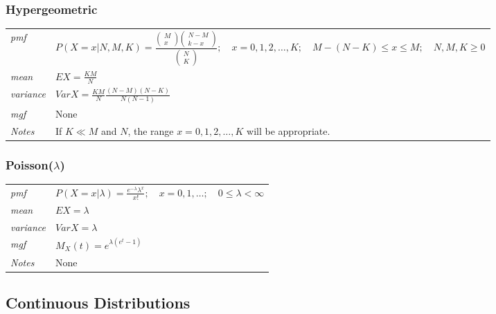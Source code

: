 \documentclass[12pt]{article}
\begin{document}
\subsubsection*{Hypergeometric \cite[p. 622]{StatisticalInference}}
\begin{tabularx}{\textwidth}{ l X }
\emph{pmf} & $P(X=x|N, M, K)=\frac{
\begin{pmatrix}
M \\
x
\end{pmatrix}
\begin{pmatrix}
N - M \\
k - x
\end{pmatrix}
}{
\begin{pmatrix}
N \\
K
\end{pmatrix}}; \quad x=0, 1, 2, \dots, K; \quad M - (N - K) \leq x \leq M; \quad N, M, K \geq 0$ \\
\emph{mean} & $EX=\frac{KM}{N}$ \\
\emph{variance} & $Var X = \frac{KM}{N} \frac{(N-M)(N-K)}{N(N-1)}$ \\
\emph{mgf} & None \\
\emph{Notes} & If $K \ll M$ and $N$, the range $x=0, 1, 2, \dots, K$ will be appropriate.\\
\end{tabularx}

\subsubsection*{Poisson($\lambda$) \cite[p. 622]{StatisticalInference}}
\begin{tabularx}{\textwidth}{ l X }
\emph{pmf} & $P(X=x|\lambda)=\frac{e^{-\lambda}\lambda^x}{x!}; \quad x=0, 1, \dots; \quad 0 \leq \lambda <\infty$ \\
\emph{mean} & $EX=\lambda$ \\
\emph{variance} & $Var X =\lambda$ \\
\emph{mgf} & $M_X(t)=e^{\lambda(e^t-1)}$ \\
\emph{Notes} & None\\
\end{tabularx}

\subsection*{Continuous Distributions}
\end{document}
